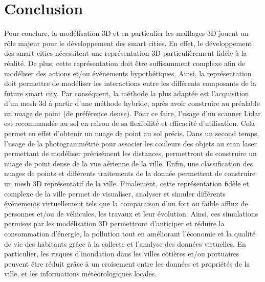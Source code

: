 \section{Conclusion}
Pour conclure, la modélisation 3D et en particulier les maillages 3D jouent un rôle majeur pour le développement des smart cities. En effet, le développement des smart cities nécessitent une représentation 3D particulièrement fidèle à la réalité. De plus, cette représentation doit être suffisamment complexe afin de modéliser des actions et/ou événements hypothétiques. Ainsi, la représentation doit permettre de modéliser les interactions entre les différents composants de la future smart city. Par conséquent, la méthode la plus adaptée est l'acquisition d'un mesh 3d à partir d'une méthode hybride, après avoir construire au préalable un nuage de point (de préférence dense). Pour ce faire, l'usage d'un scanner Lidar est recommandée au sol en raison de sa flexibilité et efficacité d'utilisation. Cela permet en effet d'obtenir un nuage de point au sol précis. Dans un second temps, l'usage de la photogrammétrie pour associer les couleurs des objets au scan laser permettant de modéliser précisément les distances, permettront de construire un nuage de point dense de la vue aérienne de la ville. Enfin, une classification des nuages de points et différents traitements de la donnée permettent de construire un mesh 3D représentatif de la ville.
Finalement, cette représentation fidèle et complexe de la ville permet de visualiser, analyser et simuler différents événements virtuellement tels que la comparaison d'un fort ou faible afflux de personnes et/ou de véhicules, les travaux et leur évolution. Ainsi, ces simulations permises par les modélisation 3D permettront d'anticiper et réduire la consommation d'énergie, la pollution tout en améliorant l'économie et la qualité de vie des habitants grâce à la collecte et l'analyse des données virtuelles. En particulier, les risques d'inondation dans les villes côtières et/ou portuaires peuvent être réduit grâce à un croisement entre les données et propriétés de la ville, et les informations météorologiques locales.
